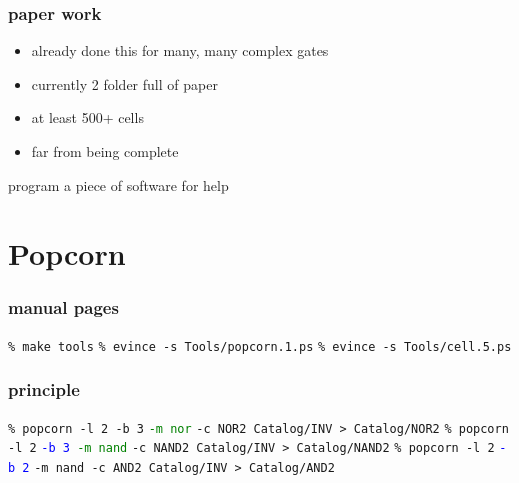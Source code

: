 \documentclass[aspectratio=169]{beamer}
\begin{document}
\begin{frame}
\frametitle{paper work}
    \begin{itemize}
        \item already done this for many, many complex gates
        \item currently 2 folder full of paper
        \item at least 500+ cells
        \item far from being complete
    \end{itemize}
program a piece of software for help
\end{frame}

\section{Popcorn}


\begin{frame}
\frametitle{manual pages}
    \texttt{\% make tools}
    \newline
    \texttt{\% evince -s Tools/popcorn.1.ps}
    \newline
    \texttt{\% evince -s Tools/cell.5.ps}
\end{frame}


\begin{frame}
\frametitle{principle}
    \begin{center}
    \end{center}
    \texttt{\% popcorn -l 2 -b 3}
    \texttt{\textcolor{green}{-m nor}}
    \texttt{-c NOR2 Catalog/INV > Catalog/NOR2}
    \newline
    \texttt{\% popcorn -l 2}
    \texttt{\textcolor{blue}{-b 3} \textcolor{green}{-m nand}}
    \texttt{-c NAND2 Catalog/INV > Catalog/NAND2}
    \newline
    \texttt{\% popcorn -l 2}
    \texttt{\textcolor{blue}{-b 2}}
    \texttt{-m nand -c AND2 Catalog/INV > Catalog/AND2}
\end{frame}
\end{document}
